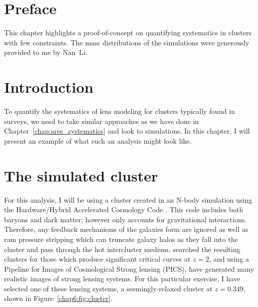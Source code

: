 \section{Preface}

This chapter highlights a proof-of-concept on quantifying systematics in clusters with few constraints. The mass distributions of the simulations were generously provided to me by Nan~Li.

\section{Introduction}

To quantify the systematics of lens modeling for clusters typically found in surveys, we need to take similar approaches as we have done in Chapter~\ref{chap:ares_systematics} and look to simulations. In this chapter, I will present an example of what such an analysis might look like.

\section{The simulated cluster}

For this analysis, I will be using a cluster created in an N-body simulation using the Hardware/Hybrid Accelerated Cosmology Code \citep[HACC; ][]{Habib:2016cy}. This code includes both baryons and dark matter; however only accounts for gravitational interactions. Therefore, any feedback mechanisms of the galaxies form are ignored as well as ram pressure stripping which can truncate galaxy halos as they fall into the cluster and pass through the hot intercluster medium. \citet{Li:2016ek} searched the resulting clusters for those which produce significant critical curves at $z=2$, and using a Pipeline for Images of Cosmological Strong lensing (PICS), have generated many realistic images of strong lensing systems. For this particular exercise, I have selected one of these lensing systems, a seemingly-relaxed cluster at $z=0.349$, shown in Figure~\ref{chap6:fig:cluster}.

